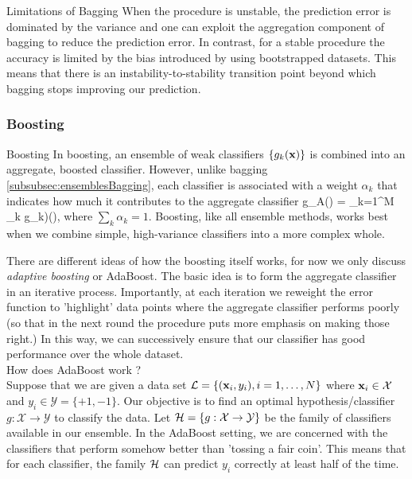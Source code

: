 \begin{mybox}{Limitations of Bagging}
When the procedure is unstable, the prediction error is dominated by the variance and one can exploit the aggregation component of bagging to reduce the prediction error. In contrast, for a stable procedure the accuracy is limited by the bias introduced by using bootstrapped datasets. This means that there is an instability-to-stability transition point beyond which bagging stops improving our prediction.
\end{mybox}
\subsubsection{Boosting}
\label{subsubsec:ensemblesBoosting}
 \begin{mybox}{Boosting}
 	In boosting, an ensemble of weak classifiers $\{g_k(\mathbf{x})\}$ is combined into an aggregate, boosted classifier. However, unlike bagging \ref{subsubsec:ensemblesBagging}, each classifier is associated with a weight $\alpha_k$ that indicates how much it contributes to the aggregate classifier
 	\be 
 	\label{eq:ensemblesBoostingAggregateClassifier}
 	g_A(\mx) = \sum_{k=1}^M \alpha_k g_k)(\mx),
 	\ee 
 	where $\sum_k \alpha_k =1$. Boosting, like all ensemble methods, works best when we combine simple, high-variance classifiers into a more complex whole.
 \end{mybox}
There are different ideas of how the boosting itself works, for now we only discuss \emph{adaptive boosting} or AdaBoost. The basic idea is to form the aggregate classifier in an iterative process. Importantly, at each iteration we reweight the error function to ’highlight’ data points where the aggregate classifier performs poorly (so that in the next round the procedure puts more emphasis on making those right.) In this way, we can successively ensure that our classifier has good performance over the whole dataset.\\
How does AdaBoost work ?\\
Suppose that we are given a data set $\mathcal{L}=\{(\mathbf{x}_i,y_i),i=1,\dots,N\}$ where $\mathbf{x}_i \in \mathcal{X}$ and $y_i\in\mathcal{Y}=\{+1,-1\}$. Our objective is to find an optimal hypothesis/classifier $g:\mathcal{X}\rightarrow \mathcal{Y}$ to classify the data. Let $\mathcal{H}=\{g:\mathcal{X}\rightarrow \mathcal{Y}\}$ be the family of classifiers available in our ensemble. In the AdaBoost setting, we are concerned with the classifiers that perform somehow better than ’tossing a fair coin’. This means that for each classifier, the family $\mathcal{H}$ can predict $y_i$ correctly at least half of the time.\\
